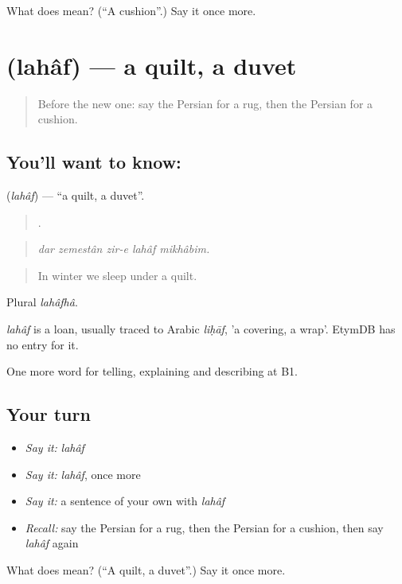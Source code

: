 \begin{tcolorbox}[breakable,colback=teal!4,colframe=teal!35!black,title={Before you move on}]
What does  mean? (\textquotedblleft{}A cushion\textquotedblright{}.) Say it once more.
\end{tcolorbox}
\section[\texorpdfstring{\fa{لحاف} (lahâf)}{لحاف (lahâf)}]{ (lahâf) — a quilt, a duvet}

\label{lesson:FA-C534-lahaf}



\begin{quote}
Before the new one: say the Persian for a rug, then the Persian for a cushion.
\end{quote}

\subsection*{You'll want to know: }
\textbf{} (\emph{lahâf}) — \textquotedblleft{}a quilt, a duvet\textquotedblright{}.

\begin{quote}
    .
\end{quote}

\begin{quote}
\emph{dar zemestân zir-e lahâf mikhâbim.}
\end{quote}

\begin{quote}
In winter we sleep under a quilt.
\end{quote}

Plural \emph{lahâfhâ}.

\begin{cousinweb}
\emph{lahâf} is a loan, usually traced to Arabic \emph{liḥāf}, 'a covering, a wrap'. EtymDB has no entry for it.
\end{cousinweb}

\begin{grammarlens}[title={What you've built}]
One more word for telling, explaining and describing at B1.
\end{grammarlens}

\subsection*{Your turn}
\begin{itemize}
\raggedright
  \item \emph{Say it:} \emph{lahâf}
  \item \emph{Say it:} \emph{lahâf}, once more
  \item \emph{Say it:} a sentence of your own with \emph{lahâf}
  \item \emph{Recall:} say the Persian for a rug, then the Persian for a cushion, then say \emph{lahâf} again
\end{itemize}

\begin{tcolorbox}[breakable,colback=teal!4,colframe=teal!35!black,title={Before you move on}]
What does  mean? (\textquotedblleft{}A quilt, a duvet\textquotedblright{}.) Say it once more.
\end{tcolorbox}
